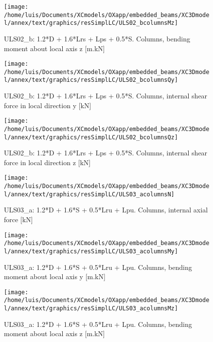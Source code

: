 \begin{figure}
\begin{center}
\texttt{[image: /home/luis/Documents/XCmodels/OXapp/embedded\_beams/XC3Dmodel/annex/text/graphics/resSimplLC/ULS02\_bcolumnsMz]}
\caption{ULS02_b: 1.2*D + 1.6*Lrs + Lps + 0.5*S. Columns, bending moment about local axis z [m.kN]}
\end{center}
\end{figure}
\begin{figure}
\begin{center}
\texttt{[image: /home/luis/Documents/XCmodels/OXapp/embedded\_beams/XC3Dmodel/annex/text/graphics/resSimplLC/ULS02\_bcolumnsQy]}
\caption{ULS02_b: 1.2*D + 1.6*Lrs + Lps + 0.5*S. Columns, internal shear force in local direction y [kN]}
\end{center}
\end{figure}
\begin{figure}
\begin{center}
\texttt{[image: /home/luis/Documents/XCmodels/OXapp/embedded\_beams/XC3Dmodel/annex/text/graphics/resSimplLC/ULS02\_bcolumnsQz]}
\caption{ULS02_b: 1.2*D + 1.6*Lrs + Lps + 0.5*S. Columns, internal shear force in local direction z [kN]}
\end{center}
\end{figure}
\clearpage
\begin{figure}
\begin{center}
\texttt{[image: /home/luis/Documents/XCmodels/OXapp/embedded\_beams/XC3Dmodel/annex/text/graphics/resSimplLC/ULS03\_acolumnsN]}
\caption{ULS03_a: 1.2*D + 1.6*S + 0.5*Lru + Lpu. Columns, internal axial force [kN]}
\end{center}
\end{figure}
\begin{figure}
\begin{center}
\texttt{[image: /home/luis/Documents/XCmodels/OXapp/embedded\_beams/XC3Dmodel/annex/text/graphics/resSimplLC/ULS03\_acolumnsMy]}
\caption{ULS03_a: 1.2*D + 1.6*S + 0.5*Lru + Lpu. Columns, bending moment about local axis y [m.kN]}
\end{center}
\end{figure}
\begin{figure}
\begin{center}
\texttt{[image: /home/luis/Documents/XCmodels/OXapp/embedded\_beams/XC3Dmodel/annex/text/graphics/resSimplLC/ULS03\_acolumnsMz]}
\caption{ULS03_a: 1.2*D + 1.6*S + 0.5*Lru + Lpu. Columns, bending moment about local axis z [m.kN]}
\end{center}
\end{figure}
